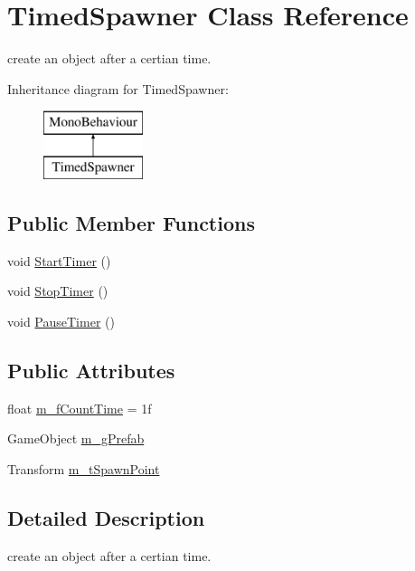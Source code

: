 \hypertarget{class_timed_spawner}{}\section{Timed\+Spawner Class Reference}
\label{class_timed_spawner}


create an object after a certian time.  


Inheritance diagram for Timed\+Spawner\+:\begin{figure}[H]
\begin{center}
\leavevmode
\includegraphics[height=2.000000cm]{class_timed_spawner}
\end{center}
\end{figure}
\subsection*{Public Member Functions}
\begin{DoxyCompactItemize}
\item 
void \mbox{\hyperlink{class_timed_spawner_af79fc468787120b9f052aecbbfffef38}{Start\+Timer}} ()
\item 
void \mbox{\hyperlink{class_timed_spawner_a0e3fed885d7c03676d7c963daf23423a}{Stop\+Timer}} ()
\item 
void \mbox{\hyperlink{class_timed_spawner_abf68808965e5d37fdd2ef4a92822df4f}{Pause\+Timer}} ()
\end{DoxyCompactItemize}
\subsection*{Public Attributes}
\begin{DoxyCompactItemize}
\item 
float \mbox{\hyperlink{class_timed_spawner_a76283a3f5526a4a64c636c12e2efaf9d}{m\+\_\+f\+Count\+Time}} = 1f
\item 
Game\+Object \mbox{\hyperlink{class_timed_spawner_abf1afa5f5af371194f717a23e41b19db}{m\+\_\+g\+Prefab}}
\item 
Transform \mbox{\hyperlink{class_timed_spawner_a03e7bbaf25baec333337c7d4d64aa890}{m\+\_\+t\+Spawn\+Point}}
\end{DoxyCompactItemize}


\subsection{Detailed Description}
create an object after a certian time. 



